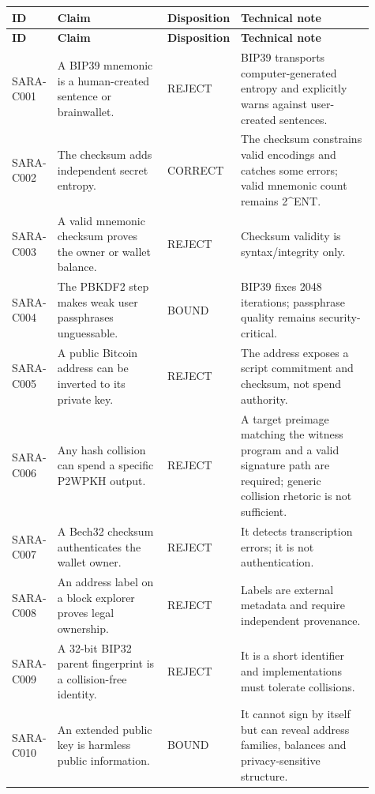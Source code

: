 \setlength{\tabcolsep}{3pt}\begin{longtable}{@{}p{0.09\linewidth} p{0.33\linewidth} p{0.09\linewidth} p{0.40\linewidth}@{}}
\toprule
\textbf{ID} & \textbf{Claim} & \textbf{Disposition} & \textbf{Technical note}\\
\midrule
\endfirsthead
\toprule
\textbf{ID} & \textbf{Claim} & \textbf{Disposition} & \textbf{Technical note}\\
\midrule
\endhead
SARA-C001 & A BIP39 mnemonic is a human-created sentence or brainwallet. & REJECT & BIP39 transports computer-generated entropy and explicitly warns against user-created sentences.\\
\addlinespace[1.5pt]
SARA-C002 & The checksum adds independent secret entropy. & CORRECT & The checksum constrains valid encodings and catches some errors; valid mnemonic count remains 2\textasciicircum{}ENT.\\
\addlinespace[1.5pt]
SARA-C003 & A valid mnemonic checksum proves the owner or wallet balance. & REJECT & Checksum validity is syntax/integrity only.\\
\addlinespace[1.5pt]
SARA-C004 & The PBKDF2 step makes weak user passphrases unguessable. & BOUND & BIP39 fixes 2048 iterations; passphrase quality remains security-critical.\\
\addlinespace[1.5pt]
SARA-C005 & A public Bitcoin address can be inverted to its private key. & REJECT & The address exposes a script commitment and checksum, not spend authority.\\
\addlinespace[1.5pt]
SARA-C006 & Any hash collision can spend a specific P2WPKH output. & REJECT & A target preimage matching the witness program and a valid signature path are required; generic collision rhetoric is not sufficient.\\
\addlinespace[1.5pt]
SARA-C007 & A Bech32 checksum authenticates the wallet owner. & REJECT & It detects transcription errors; it is not authentication.\\
\addlinespace[1.5pt]
SARA-C008 & An address label on a block explorer proves legal ownership. & REJECT & Labels are external metadata and require independent provenance.\\
\addlinespace[1.5pt]
SARA-C009 & A 32-bit BIP32 parent fingerprint is a collision-free identity. & REJECT & It is a short identifier and implementations must tolerate collisions.\\
\addlinespace[1.5pt]
SARA-C010 & An extended public key is harmless public information. & BOUND & It cannot sign by itself but can reveal address families, balances and privacy-sensitive structure.\\

\end{longtable}
